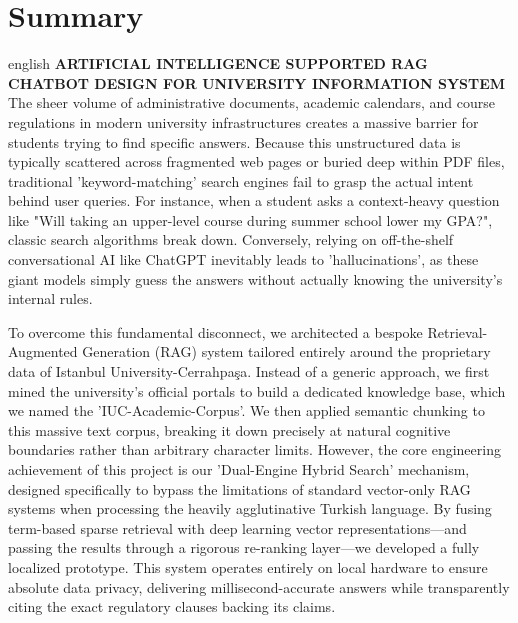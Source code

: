 \documentclass[12pt,a4paper]{report}
\begin{document}
\chapter*{Summary}
\begin{otherlanguage*}{english}
\textbf{ARTIFICIAL INTELLIGENCE SUPPORTED RAG CHATBOT DESIGN FOR UNIVERSITY INFORMATION SYSTEM}\\[0.5cm]

The sheer volume of administrative documents, academic calendars, and course regulations in modern university infrastructures creates a massive barrier for students trying to find specific answers. Because this unstructured data is typically scattered across fragmented web pages or buried deep within PDF files, traditional 'keyword-matching' search engines fail to grasp the actual intent behind user queries. For instance, when a student asks a context-heavy question like "Will taking an upper-level course during summer school lower my GPA?", classic search algorithms break down. Conversely, relying on off-the-shelf conversational AI like ChatGPT inevitably leads to 'hallucinations', as these giant models simply guess the answers without actually knowing the university's internal rules.

To overcome this fundamental disconnect, we architected a bespoke Retrieval-Augmented Generation (RAG) system tailored entirely around the proprietary data of Istanbul University-Cerrahpaşa. Instead of a generic approach, we first mined the university's official portals to build a dedicated knowledge base, which we named the 'IUC-Academic-Corpus'. We then applied semantic chunking to this massive text corpus, breaking it down precisely at natural cognitive boundaries rather than arbitrary character limits. However, the core engineering achievement of this project is our 'Dual-Engine Hybrid Search' mechanism, designed specifically to bypass the limitations of standard vector-only RAG systems when processing the heavily agglutinative Turkish language. By fusing term-based sparse retrieval with deep learning vector representations—and passing the results through a rigorous re-ranking layer—we developed a fully localized prototype. This system operates entirely on local hardware to ensure absolute data privacy, delivering millisecond-accurate answers while transparently citing the exact regulatory clauses backing its claims.
\end{otherlanguage*}

\cleardoublepage
{}
\end{document}
